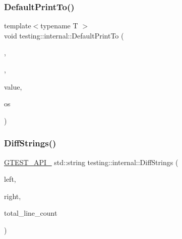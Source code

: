 \subsubsection{\texorpdfstring{Default\+Print\+To()}{DefaultPrintTo()}\hspace{0.1cm}{\footnotesize\ttfamily [3/3]}}
{\footnotesize\ttfamily template$<$typename T $>$ \\
void testing\+::internal\+::\+Default\+Print\+To (\begin{DoxyParamCaption}\item[{\hyperlink{namespacetesting_1_1internal_abf080521ce135deb510e0a7830fd3d33}{Is\+Not\+Container}}]{,  }\item[{\hyperlink{namespacetesting_1_1internal_abb1d0789f19bdde21affccbd1078b525}{false\+\_\+type}}]{,  }\item[{const T \&}]{value,  }\item[{\+::std\+::ostream $\ast$}]{os }\end{DoxyParamCaption})}

\mbox{\label{namespacetesting_1_1internal_a513107ff8defa97d949937fc1350a56c}} 
\subsubsection{\texorpdfstring{Diff\+Strings()}{DiffStrings()}}
{\footnotesize\ttfamily \hyperlink{gtest-port_8h_aa73be6f0ba4a7456180a94904ce17790}{G\+T\+E\+S\+T\+\_\+\+A\+P\+I\+\_\+} std\+::string testing\+::internal\+::\+Diff\+Strings (\begin{DoxyParamCaption}\item[{const std\+::string \&}]{left,  }\item[{const std\+::string \&}]{right,  }\item[{size\+\_\+t $\ast$}]{total\+\_\+line\+\_\+count }\end{DoxyParamCaption})}

\mbox{\label{namespacetesting_1_1internal_a4f70b36c624b54c2362aeecc2f05ee8c}} 
